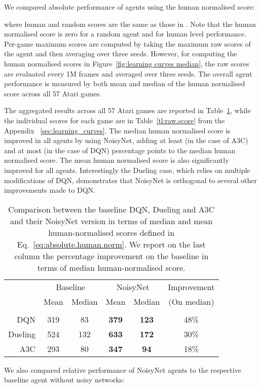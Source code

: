 \documentclass{article}
\newcommand{\algoinit}{NoisyNet}
\begin{document}
We compared absolute performance of agents using the human normalised score:

where human and random scores are the same as those in \cite{wang2016Dueling}.
Note that the human normalised score is zero for a random agent and  for human level performance. Per-game maximum scores are computed by taking the maximum raw scores of the agent and then averaging over three seeds. However, for computing the human normalised scores in Figure~\ref{fig:learning curves median}, the raw scores are evaluated every 1M frames and averaged over three seeds. The overall agent performance is measured by both mean and median of the human normalised score across all 57 Atari games.

The aggregated results across all 57 Atari games are reported in Table~\ref{tab:totalhuman}, while the individual scores for each game are in Table~\ref{tl:raw.score} from the Appendix~ \ref{sec:learning_curves}.
The median human normalised score is improved in all agents by using \algoinit{}, adding at least  (in the case of A3C) and at most  (in the case of DQN)  percentage points to the median human normalised score.
The mean human normalised score is also significantly improved for all agents.
Interestingly the Dueling case, which relies on multiple modifications of DQN, demonstrates that \algoinit{} is orthogonal to several other improvements made to DQN.
\begin{table}[ht!]
\centering
\begin{tabular}{rccccc}
\toprule
 & \multicolumn{2}{c}{Baseline} & \multicolumn{2}{c}{\algoinit{}}&Improvement \\
 & Mean & Median & Mean & Median& (On median) \\
 \hline
 \\
DQN & 319 & 83 & \textbf{379} & \textbf{123} & 48\%\\ 
Dueling & 524 & 132 & \textbf{633} & \textbf{172} & 30\% \\
A3C & 293 & 80 & \textbf{347} & \textbf{94} &  18\%\\
\bottomrule
\end{tabular}
\vspace{1em}
 \caption{Comparison between the baseline DQN, Dueling and A3C  and their \algoinit{} version in terms of median and mean human-normalised scores defined in Eq.~\eqref{eq:absolute.human.norm}. We report on the last column the percentage  improvement on the baseline in terms of median human-normalised score.}\label{tab:totalhuman} 
\end{table}
We also compared relative performance of \algoinit{} agents to the respective baseline agent without noisy networks:
\end{document}
